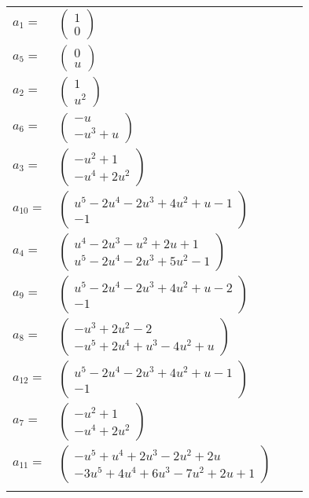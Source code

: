 \documentclass[1p]{elsarticle_modified}
\theoremstyle{definition}
\begin{document}
\begin{tabular}{m{7pt} m{180pt} m{7pt} m{180pt} }
\flushright $a_{1}=$&$\begin{pmatrix}1\\0\end{pmatrix}$ \\
\flushright $a_{5}=$&$\begin{pmatrix}0\\u\end{pmatrix}$ \\
\flushright $a_{2}=$&$\begin{pmatrix}1\\u^2\end{pmatrix}$ \\
\flushright $a_{6}=$&$\begin{pmatrix}- u\\- u^3+u\end{pmatrix}$ \\
\flushright $a_{3}=$&$\begin{pmatrix}- u^2+1\\- u^4+2 u^2\end{pmatrix}$ \\
\flushright $a_{10}=$&$\begin{pmatrix}u^5-2 u^4-2 u^3+4 u^2+u-1\\-1\end{pmatrix}$ \\
\flushright $a_{4}=$&$\begin{pmatrix}u^4-2 u^3- u^2+2 u+1\\u^5-2 u^4-2 u^3+5 u^2-1\end{pmatrix}$ \\
\flushright $a_{9}=$&$\begin{pmatrix}u^5-2 u^4-2 u^3+4 u^2+u-2\\-1\end{pmatrix}$ \\
\flushright $a_{8}=$&$\begin{pmatrix}- u^3+2 u^2-2\\- u^5+2 u^4+u^3-4 u^2+u\end{pmatrix}$ \\
\flushright $a_{12}=$&$\begin{pmatrix}u^5-2 u^4-2 u^3+4 u^2+u-1\\-1\end{pmatrix}$ \\
\flushright $a_{7}=$&$\begin{pmatrix}- u^2+1\\- u^4+2 u^2\end{pmatrix}$ \\
\flushright $a_{11}=$&$\begin{pmatrix}- u^5+u^4+2 u^3-2 u^2+2 u\\-3 u^5+4 u^4+6 u^3-7 u^2+2 u+1\end{pmatrix}$\\&\end{tabular}
\end{document}
